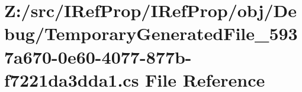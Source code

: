 \hypertarget{_debug_2_temporary_generated_file__5937a670-0e60-4077-877b-f7221da3dda1_8cs}{}\section{Z\+:/src/\+I\+Ref\+Prop/\+I\+Ref\+Prop/obj/\+Debug/\+Temporary\+Generated\+File\+\_\+5937a670-\/0e60-\/4077-\/877b-\/f7221da3dda1.cs File Reference}
\label{_debug_2_temporary_generated_file__5937a670-0e60-4077-877b-f7221da3dda1_8cs}
